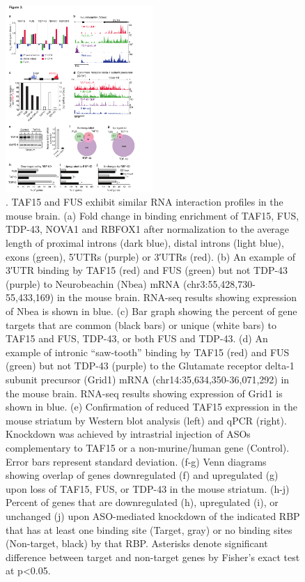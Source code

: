 \begin{figure}[ht]
  \centering
  \includegraphics[width=0.5\textwidth]{chapter_2_figures/Figure_3}
  \caption[Figure 3]{. TAF15 and FUS exhibit similar RNA interaction profiles in the mouse brain. (a) Fold change in binding enrichment of TAF15, FUS, TDP-43, NOVA1 and RBFOX1 after normalization to the average length of proximal introns (dark blue), distal introns (light blue), exons (green), 5′UTRs (purple) or 3′UTRs (red). (b) An example of 3′UTR binding by TAF15 (red) and FUS (green) but not TDP-43 (purple) to Neurobeachin (Nbea) mRNA (chr3:55,428,730-55,433,169) in the mouse brain. RNA-seq results showing expression of Nbea is shown in blue. (c) Bar graph showing the percent of gene targets that are common (black bars) or unique (white bars) to TAF15 and FUS, TDP-43, or both FUS and TDP-43. (d) An example of intronic “saw-tooth” binding by TAF15 (red) and FUS (green) but not TDP-43 (purple) to the Glutamate receptor delta-1 subunit precursor (Grid1) mRNA (chr14:35,634,350-36,071,292) in the mouse brain. RNA-seq results showing expression of Grid1 is shown in blue. (e) Confirmation of reduced TAF15 expression in the mouse striatum by Western blot analysis (left) and qPCR (right). Knockdown was achieved by intrastrial injection of ASOs complementary to TAF15 or a non-murine/human gene (Control). Error bars represent standard deviation. (f-g) Venn diagrams showing overlap of genes downregulated (f) and upregulated (g) upon loss of TAF15, FUS, or TDP-43 in the mouse striatum. (h-j) Percent of genes that are downregulated (h), upregulated (i), or unchanged (j) upon ASO-mediated knockdown of the indicated RBP that has at least one binding site (Target, gray) or no binding sites (Non-target, black) by that RBP. Asterisks denote significant difference between target and non-target genes by Fisher’s exact test at p<0.05.}
  \label{fig:Figure_3}
\end{figure}

